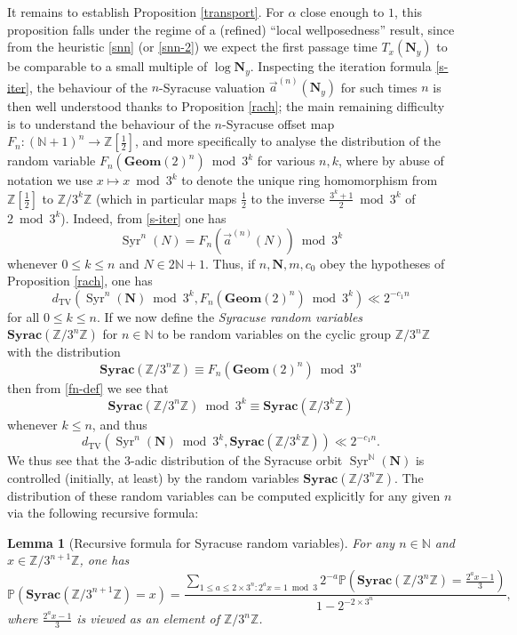 \documentclass[12pt,a4paper,reqno]{amsart}
\numberwithin{equation}{section}
\theoremstyle{plain}
\newtheorem{lemma}[theorem]{Lemma}
\theoremstyle{definition}
\renewcommand\P{\mathbb{P}}
\newcommand\Z{\mathbb{Z}}
\newcommand\N{\mathbb{N}}
\newcommand\Geom{\mathbf{Geom}}
\newcommand\Syrac{\mathbf{Syrac}}
\newcommand\TV{{\operatorname{TV}}}
\newcommand\Syr{{\operatorname{Syr}}}
\renewcommand{\mod}{\bmod}
\begin{document}
It remains to establish Proposition \ref{transport}.  For $\alpha$ close enough to $1$, this proposition falls under the regime of a (refined) ``local wellposedness'' result, since from the heuristic \eqref{snn} (or \eqref{snn-2}) we expect the first passage time $T_x(\mathbf{N}_y)$ to be comparable to a small multiple of $\log \mathbf{N}_y$.  Inspecting the iteration formula \eqref{s-iter}, the behaviour of the $n$-Syracuse valuation $\vec a^{(n)}(\mathbf{N}_y)$ for such times $n$ is then well understood thanks to Proposition \ref{rach}; the main remaining difficulty is to understand the behaviour of the $n$-Syracuse offset map $F_n\colon (\N+1)^n \to \Z[\frac{1}{2}]$, and more specifically to analyse the distribution of the random variable $F_n(\Geom(2)^n) \mod 3^k$ for various $n,k$, where by abuse of notation we use $x \mapsto x \mod 3^k$ to denote the unique ring homomorphism from $\Z[\frac{1}{2}]$ to $\Z/3^k \Z$ (which in particular maps $\frac{1}{2}$ to the inverse $\frac{3^k+1}{2} \mod 3^k$ of $2 \mod 3^k$).  Indeed, from \eqref{s-iter} one has
$$ \Syr^n(N) = F_n(\vec a^{(n)}(N)) \mod 3^k$$
whenever $0 \leq k \leq n$ and $N \in 2\N+1$.  Thus,  if $n, \mathbf{N}, m, c_0$ obey the hypotheses of Proposition \ref{rach}, one has
$$ d_\TV( \Syr^n(\mathbf{N}) \mod 3^k, F_n( \Geom(2)^n ) \mod 3^k ) \ll 2^{-c_1 n}$$
for all $0 \leq k \leq n$.  If we now define the \emph{Syracuse random variables} $\Syrac(\Z/3^n\Z)$ for $n \in \N$ to be random variables on the cyclic group $\Z/3^n\Z$ with the distribution
\begin{equation}\label{syrac-def}
 \Syrac(\Z/3^n\Z) \equiv F_n( \Geom(2)^n ) \mod 3^n 
\end{equation}
then from \eqref{fn-def} we see that
\begin{equation}\label{xlk}
 \Syrac(\Z/3^n\Z) \mod 3^k \equiv \Syrac(\Z/3^k\Z)
\end{equation}
whenever $k \leq n$, and thus
$$ d_\TV( \Syr^n(\mathbf{N}) \mod 3^k, \Syrac(\Z/3^k\Z) ) \ll 2^{-c_1 n}.$$
We thus see that the $3$-adic distribution of the Syracuse orbit $\Syr^\N(\mathbf{N})$ is controlled (initially, at least) by the random variables $\Syrac(\Z/3^n\Z)$. The distribution of these random variables can be computed explicitly for any given $n$ via the following recursive formula:

\begin{lemma}[Recursive formula for Syracuse random variables]\label{recursive} For any $n \in \N$ and $x \in \Z/3^{n+1}\Z$, one has
$$ \P( \Syrac(\Z/3^{n+1}\Z) = x ) = \frac{\sum_{1 \leq a \leq 2 \times 3^n: 2^a x = 1 \mod 3} 2^{-a} \P\left( \Syrac(\Z/3^{n}\Z)= \frac{2^a x-1}{3} \right)}{1 - 2^{-2 \times 3^n}},$$
where $\frac{2^a x-1}{3}$ is viewed as an element of $\Z/3^n\Z$.
\end{lemma}
\end{document}
